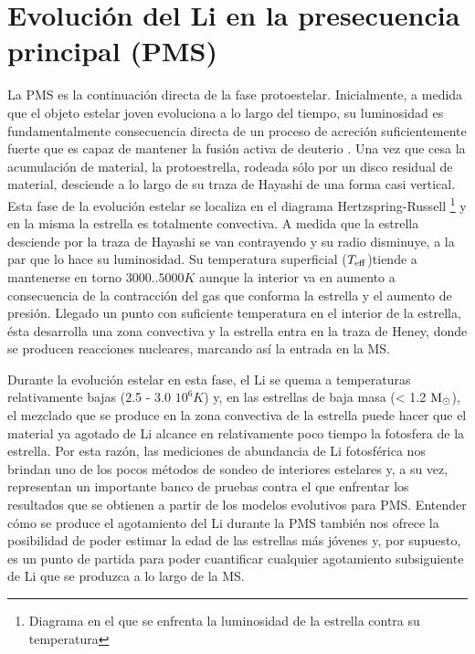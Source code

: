 \section{Evolución del Li en la presecuencia principal (PMS)}
La PMS es la continuación directa de la fase protoestelar. Inicialmente, a medida que el objeto estelar joven evoluciona a lo largo del tiempo, su luminosidad es fundamentalmente consecuencia directa de un proceso de acreción suficientemente fuerte que es capaz de mantener la fusión activa de deuterio \cite{Stahler1983}. Una vez que cesa la acumulación de material, la protoestrella, rodeada sólo por un disco residual de material, desciende a lo largo de su traza de Hayashi de una forma casi vertical. Esta fase de la evolución estelar se localiza en el diagrama Hertzspring-Russell \footnote{Diagrama en el que se enfrenta la luminosidad de la estrella contra su temperatura} y en la misma la estrella es totalmente convectiva. A medida que la estrella desciende por la traza de Hayashi se van contrayendo y su radio disminuye, a la par que lo hace su luminosidad. Su temperatura superficial ($T_{\mathrm{eff}}$)tiende a mantenerse  en torno $3000..5000 K$ aunque la interior va en aumento a consecuencia de la contracción del gas que conforma la estrella y el aumento de presión. Llegado un punto con suficiente temperatura en el interior de la estrella, ésta desarrolla una zona convectiva y la estrella entra en la traza de Heney, donde se producen reacciones nucleares, marcando así la entrada en la MS. \par

Durante la evolución estelar en esta fase, el Li se quema a temperaturas relativamente bajas (2.5 - 3.0 $10^{6} K$) y, en las estrellas de baja masa (< 1.2 $\mathrm{M}_\odot$), el mezclado que se produce en la zona convectiva de la estrella puede hacer que el material ya agotado de Li alcance en relativamente poco tiempo la fotosfera de la estrella. Por esta razón, las mediciones de abundancia de Li fotosférica nos brindan uno de los pocos métodos de sondeo de interiores estelares y, a su vez, representan un importante banco de pruebas contra el que enfrentar los resultados que se obtienen a partir de los modelos evolutivos para PMS. Entender cómo se produce el agotamiento del Li durante la PMS también nos ofrece la posibilidad de poder estimar la edad de las estrellas más jóvenes y, por supuesto, es un punto de partida para poder cuantificar cualquier agotamiento subsiguiente de Li que se produzca a lo largo de la MS.\par

